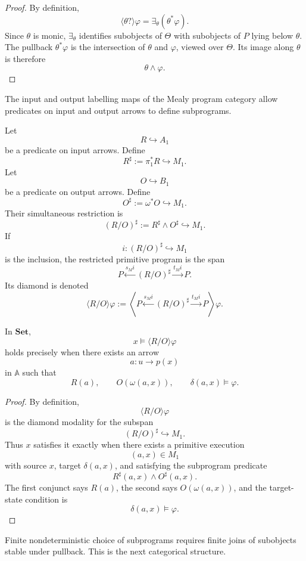 \begin{proof}
By definition,
\[
\langle\theta?\rangle\varphi
=
\exists_\theta(\theta^\ast\varphi).
\]
Since \(\theta\) is monic, \(\exists_\theta\) identifies subobjects of \(\Theta\) with subobjects of \(P\) lying below \(\theta\). The pullback \(\theta^\ast\varphi\) is the intersection of \(\theta\) and \(\varphi\), viewed over \(\Theta\). Its image along \(\theta\) is therefore
\[
\theta\wedge\varphi.
\]
\end{proof}

The input and output labelling maps of the Mealy program category allow predicates on input and output arrows to define subprograms.

Let
\[
R\hookrightarrow A_1
\]
be a predicate on input arrows. Define
\[
R^\sharp:=\pi_1^\ast R\hookrightarrow M_1.
\]
Let
\[
O\hookrightarrow B_1
\]
be a predicate on output arrows. Define
\[
O^\sharp:=\omega^\ast O\hookrightarrow M_1.
\]
Their simultaneous restriction is
\[
(R/O)^\sharp:=R^\sharp\wedge O^\sharp\hookrightarrow M_1.
\]
If
\[
i:(R/O)^\sharp\hookrightarrow M_1
\]
is the inclusion, the restricted primitive program is the span
\[
P
\xleftarrow{s_M i}
(R/O)^\sharp
\xrightarrow{t_M i}
P.
\]
Its diamond is denoted
\[
\langle R/O\rangle\varphi
:=
\left\langle
P
\xleftarrow{s_M i}
(R/O)^\sharp
\xrightarrow{t_M i}
P
\right\rangle
\varphi.
\]

\begin{proposition}
\label{prop:external-reading-input-output-modality}
In \(\mathbf{Set}\),
\[
x\models \langle R/O\rangle\varphi
\]
holds precisely when there exists an arrow
\[
a:u\to p(x)
\]
in \(\mathbb A\) such that
\[
R(a),
\qquad
O(\omega(a,x)),
\qquad
\delta(a,x)\models\varphi.
\]
\end{proposition}

\begin{proof}
By definition,
\[
\langle R/O\rangle\varphi
\]
is the diamond modality for the subspan
\[
(R/O)^\sharp\hookrightarrow M_1.
\]
Thus \(x\) satisfies it exactly when there exists a primitive execution
\[
(a,x)\in M_1
\]
with source \(x\), target \(\delta(a,x)\), and satisfying the subprogram predicate
\[
R^\sharp(a,x)\wedge O^\sharp(a,x).
\]
The first conjunct says \(R(a)\), the second says \(O(\omega(a,x))\), and the target-state condition is
\[
\delta(a,x)\models\varphi.
\]
\end{proof}

Finite nondeterministic choice of subprograms requires finite joins of subobjects stable under pullback. This is the next categorical structure.

